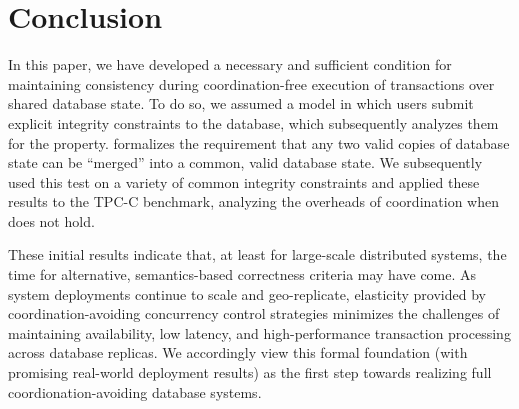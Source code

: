 
\section{Conclusion}
\label{sec:conclusion}

In this paper, we have developed a necessary and sufficient condition
for maintaining consistency during coordination-free execution of
transactions over shared database state. To do so, we assumed a model
in which users submit explicit integrity constraints to the database,
which subsequently analyzes them for the \iconfluence
property. \iconfluence formalizes the requirement that any two valid
copies of database state can be ``merged'' into a common, valid
database state. We subsequently used this test on a variety of common
integrity constraints and applied these results to the TPC-C
benchmark, analyzing the overheads of coordination when \iconfluence
does not hold.

These initial results indicate that, at least for large-scale
distributed systems, the time for alternative, semantics-based
correctness criteria may have come. As system deployments continue to
scale and geo-replicate, elasticity provided by coordination-avoiding
concurrency control strategies minimizes the challenges of maintaining
availability, low latency, and high-performance transaction processing
across database replicas. We accordingly view this formal foundation
(with promising real-world deployment results) as the first step
towards realizing full coordionation-avoiding database systems.
